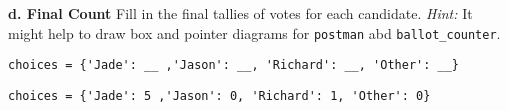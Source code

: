 \begin{blocksection}
\vspace{1\baselineskip}
\textbf{d. Final Count}
Fill in the final tallies of votes for each candidate.
\emph{Hint:} It might help to draw box and pointer diagrams for \lstinline{postman} abd \lstinline{ballot_counter}.
\vspace{1\baselineskip}
\begin{lstlisting}
choices = {'Jade': __ ,'Jason': __, 'Richard': __, 'Other': __}

\end{lstlisting}
\begin{solution}[1in]
\begin{lstlisting}
choices = {'Jade': 5 ,'Jason': 0, 'Richard': 1, 'Other': 0}
\end{lstlisting}
\end{solution}

\end{blocksection}
